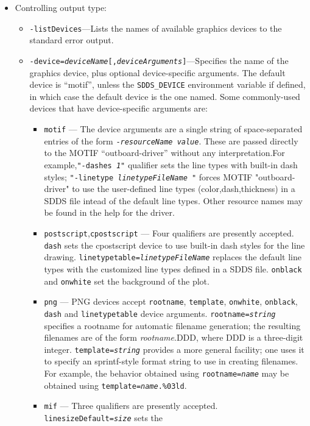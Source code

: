 \begin{itemize}
\begin{itemize}
\item Controlling output type:
  \begin{itemize}
  \item {\tt -listDevices}---Lists the names of available graphics devices to the standard error output.
  \item {\tt -device={\em deviceName}[,{\em deviceArguments}]}---Specifies the name of the graphics
        device, plus optional device-specific arguments.  The default device is ``motif'', unless the
        {\tt SDDS\_DEVICE} environment variable if defined, in which case the default device is the one
        named.
        Some commonly-used devices that have device-specific arguments are:
        \begin{itemize} 
        \item {\tt motif} --- The device arguments are a single string of space-separated entries of the
        form {\tt -{\em resourceName} {\em value}}.  These are passed directly to the MOTIF ``outboard-driver''
        without any interpretation.For example,{\tt "-dashes {\em 1}"} qualifier sets the line types with 
        built-in dash styles; {\tt "-linetype {\em linetypeFileName }"} forces MOTIF "outboard-driver" to use
        the user-defined line types (color,dash,thickness)  in a SDDS file intead of the default line types. 
        Other resource names may be found in the help for the driver. 
        \item {\tt postscript},{\tt cpostscript} --- Four qualifiers are presently accepted. {\tt dash} sets
        the cpostscript device to use built-in dash styles for the line drawing. 
        {\tt linetypetable={\em linetypeFileName}} replaces the default line types with the customized line types
        defined in a SDDS file. {\tt onblack} and {\tt onwhite} set the background of the plot.
        \item {\tt png} --- PNG devices accept {\tt rootname}, {\tt template}, {\tt onwhite}, {\tt onblack}, 
        {\tt dash} and {\tt linetypetable}  device arguments. {\tt rootname={\em string}} specifies a rootname
        for automatic filename generation; the resulting filenames are of the form {\em rootname}.DDD, where DDD 
        is a three-digit integer. {\tt template={\em string}} provides a more general facility; one uses it to
        specify an sprintf-style format string to use in creating filenames. For example, the behavior obtained
        using {\tt rootname={\em name}} may be obtained  using {\tt template={\em name}.\%03ld}.
        \item {\tt mif} --- Three qualifiers are presently accepted.  {\tt linesizeDefault={\em size}} sets the

\end{itemize}
\end{itemize}
\end{itemize}
\end{itemize}
